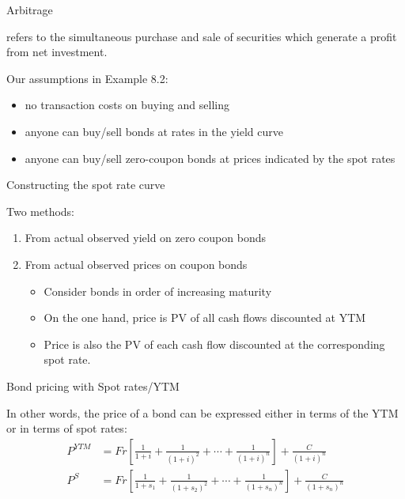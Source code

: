 \documentclass{beamer}
\begin{document}
\begin{frame}{Arbitrage}

 refers to the simultaneous purchase and sale of securities which generate a  profit from  net investment.

\bigskip
Our assumptions in Example 8.2:
\begin{itemize}
\item no transaction costs on buying and selling
\item anyone can buy/sell bonds at rates in the yield curve
\item anyone can buy/sell zero-coupon bonds at prices indicated by the spot rates
\end{itemize}

\end{frame}

\begin{frame}{Constructing the spot rate curve}

Two methods:
\begin{enumerate}
\item From actual observed yield on zero coupon bonds
\item From actual observed prices on coupon bonds
\begin{itemize}
\item Consider bonds in order of increasing maturity
\item On the one hand, price is PV of all cash flows discounted at YTM
\item Price is also the PV of each cash flow discounted at the corresponding spot rate.
\end{itemize}
\end{enumerate}

\end{frame}

\begin{frame}{Bond pricing with Spot rates/YTM}

In other words, the price of a bond can be expressed either in terms of the YTM or in terms of spot rates:
\begin{align*}
P^{YTM} &= Fr\left[\frac{1}{1+i} + \frac{1}{(1+i)^2} + \cdots + \frac{1}{(1+i)^n}\right] + \frac{C}{(1+i)^n} \\[1ex]
P^{S} &= Fr\left[\frac{1}{1+s_1} + \frac{1}{(1+s_2)^2} + \cdots + \frac{1}{(1+s_n)^n}\right] + \frac{C}{(1+s_n)^n}
\end{align*}

\end{frame}
\end{document}
